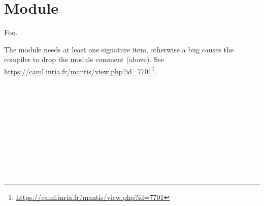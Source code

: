 \section{Module }\label{Module}%
Foo.

\label{Module-val-foo}\begin{ocamlindent}The module needs at least one signature item, otherwise a bug causes the compiler to drop the module comment (above). See \href{https://caml.inria.fr/mantis/view.php?id=7701}{https://caml.inria.fr/mantis/view.php?id=7701}\footnote{\url{https://caml.inria.fr/mantis/view.php?id=7701}}.\end{ocamlindent}%
\medbreak
\label{Module-module-type-S}\begin{ocamlindent}\label{Module-module-type-S-type-t}\\
\label{Module-module-type-S-type-u}\\
\label{Module-module-type-S-type-v}\\
\label{Module-module-type-S-type-w}\\
\label{Module-module-type-S-module-M}\begin{ocamlindent}\end{ocamlindent}%
\\
\end{ocamlindent}%
\\
\label{Module-module-type-S1}\\
\label{Module-module-type-S2}\\
